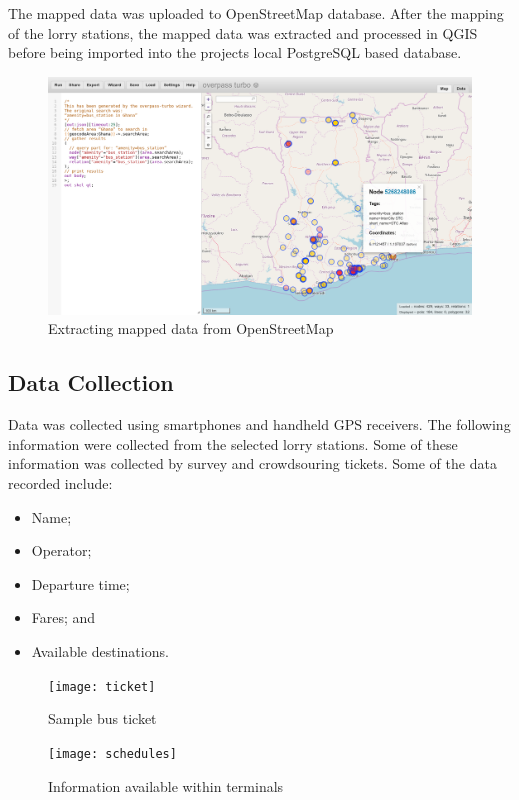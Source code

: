The mapped data was uploaded to OpenStreetMap database. After the mapping of the lorry stations, the mapped data was extracted and processed in QGIS before being imported into the projects local PostgreSQL based database.

\begin{figure}[H]
	\centering
	\includegraphics[width=0.7\linewidth]{3/figures/overpass}
	\caption[Extracting mapped data from OpenStreetMap]{Extracting mapped data from OpenStreetMap}
	\label{fig:overpass}
\end{figure}


\subsection{Data Collection}
Data was collected using smartphones and handheld GPS receivers. The following information were collected from the selected lorry stations. Some of these information was collected by survey and crowdsouring tickets. Some of the data recorded include:
\begin{itemize}
	\item Name;
	\item Operator;
	\item Departure time;
	\item Fares; and 
	\item Available destinations.
\end{itemize}

\begin{figure}[H]
	\centering
	\texttt{[image: ticket]}
	\caption[Sample bus ticket]{Sample bus ticket}
	\label{fig:ticket}
\end{figure}

\begin{figure}[H]
	\centering
	\texttt{[image: schedules]}
	\caption[Information available within terminals]{Information available within terminals}
	\label{fig:schedules}
\end{figure}

